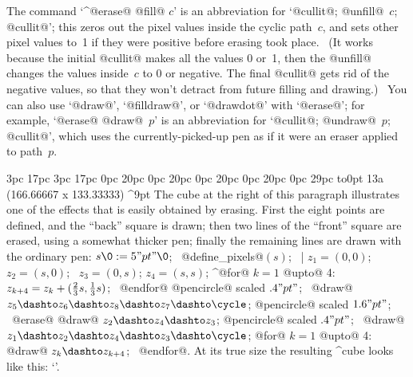 {{{{\danger The command `^@erase@ @fill@ $c$' is an abbreviation for
`@cullit@; @unfill@~$c$; @cullit@'; this zeros out the pixel values inside
the cyclic path~$c$, and sets other pixel values to~1 if they were positive
before erasing took place. \ (It works because the initial @cullit@ makes
all the values 0 or~1, then the @unfill@ changes the values inside~$c$
to 0 or negative. The final @cullit@ gets rid of the negative values,
so that they won't detract from future filling and drawing.) \ You can
also use `@draw@', `@filldraw@', or `@drawdot@' with `@erase@'; for example,
`@erase@ @draw@~$p$' is an abbreviation for `@cullit@; @undraw@~$p$;
@cullit@', which uses the currently-picked-up pen as if it were an
eraser applied to path~$p$.

{\ninepoint
\medbreak
{} 3pc 17pc 3pc 17pc
0pc 20pc 0pc 20pc 0pc 20pc 0pc 20pc 0pc 29pc
\noindent
\hbox to0pt{\hskip-3pc\dbend\hfill}
\rightfig 13a ({166.66667\apspix} x {133.33333\apspix}) ^9pt
The cube at the right of this paragraph illustrates one of the effects that
is easily obtained by erasing. First the eight points are defined, and
the ``back'' square is drawn; then two lines of the ``front'' square are
erased, using a somewhat thicker pen; finally the remaining lines are
drawn with the ordinary pen:
\begindisplay
$s\0:=5"pt"\0$; \ @define\_pixels@$(s)$; \ |%
$z_1=(0,0)$; \ $z_2=(s,0)$; \ $z_3=(0,s)$; $z_4=(s,s)$;\cr
^@for@ $k=1$ @upto@ 4: $z_{k+4}=z_k+({2\over3}s,{1\over3}s)$; \ @endfor@\cr
\pickup @pencircle@ scaled $.4"pt"$; \
@draw@ $z_5\dashto z_6\dashto z_8\dashto z_7\dashto \cycle$;\cr
\pickup @pencircle@ scaled $1.6"pt"$; \
@erase@ @draw@ $z_2\dashto z_4\dashto z_3$;\cr
\pickup @pencircle@ scaled $.4"pt"$; \
@draw@ $z_1\dashto z_2\dashto z_4\dashto z_3\dashto \cycle$;\cr
@for@ $k=1$ @upto@ 4: @draw@ $z_k\dashto z_{k+4}$; \ @endfor@.\cr
\enddisplay
At its true size the resulting ^{cube} looks like this:
`\thinspace{\manual\cubea}\thinspace'.\par}

}}}}
